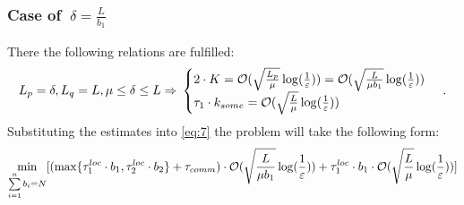 \documentclass{article}
\begin{document}
\subsubsection{Case of $~\delta = \frac{L}{b_1}$}
There the following relations are fulfilled:
\begin{equation}
    \notag
    L_p = \delta, L_q = L, \mu \leq \delta \leq L \Rightarrow 
    \\
    \notag
    \begin{cases}
      2\cdot K = \mathcal O(\sqrt{\frac{L_p}{\mu}}\log(\frac{1}{\varepsilon}))  = \mathcal O(\sqrt{\frac{L}{\mu b_1}}\log(\frac{1}{\varepsilon}))\\
      \tau_1\cdot k_{some} = \mathcal O(\sqrt{\frac{L}{\mu}}\log(\frac{1}{\varepsilon}))
    \end{cases}\,.
\end{equation}
Substituting the estimates into \eqref{eq:7}  the problem will take the following form:
\begin{equation}
    \notag
    \underset{\sum\limits_{i = 1}^{n} b_i = N}{\min}[(\max\{\tau_1^{loc}\cdot b_1, \tau_2^{loc}\cdot b_2\} + \tau_{comm}) \cdot \mathcal O(\sqrt{\frac{L}{\mu {b_1}}}\log(\frac{1}{\varepsilon})) + \tau_1^{loc}\cdot b_1 \cdot \mathcal O(\sqrt{\frac{L}{\mu}}\log(\frac{1}{\varepsilon}))]
\end{equation}
\end{document}
